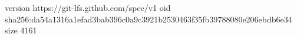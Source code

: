 version https://git-lfs.github.com/spec/v1
oid sha256:da54a1316a1efad3bab396c0a9c3921b2530463f35fb39788080e206ebdb6e34
size 4161
